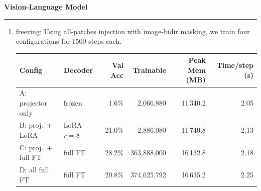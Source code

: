\documentclass[11pt]{article}
\newenvironment{question}[1]
    {
        \begin{center}
        \textbf{#1} \rmfamily
        \bigskip
        \hrule
    }
    {
        \end{center}
    }
\begin{document}
\begin{question}{Vision-Language Model}
\begin{enumerate}[label=(\alph*)]
    Contrary to the theoretical prediction, causal masking (M1) substantially outperforms image-bidir (M2) at 500 steps in the projector-only setting. With a randomly initialised projector, bidirectional visual self-attention in the decoder mixes 65 uninformative patch embeddings with each other, producing chaotic visual representations; the frozen decoder's attention heads — trained exclusively on causal text sequences — amplify this chaos rather than filtering it. The causal mask is closer to what the frozen decoder was pretrained on, so the question-token representations degrade less. M2 is also 2.77$\times$ slower per step due to SDPA with the custom 4D additive mask. Under a freeze configuration that adapts the decoder (B/C/D), M2's theoretical advantage would likely emerge.

    \item freezing: Using all-patches injection with image-bidir masking, we train four configurations for 1500 steps each.

    \begin{center}
    \begin{tabular}{llrrrr}
    \toprule
    Config & Decoder & Val Acc & Trainable & Peak Mem (MB) & Time/step (s) \\
    \midrule
    A: projector only   & frozen      &  1.6\% &      2,066,880 & 11\,340.2 & 2.05 \\
    B: proj.\ + LoRA    & LoRA $r=8$  & 21.0\% &      2,886,080 & 11\,740.8 & 2.13 \\
    C: proj.\ + full FT & full FT     & 28.2\% & 363,888,000    & 16\,132.8 & 2.18 \\
    D: all full FT      & full FT     & 20.8\% & 374,625,792    & 16\,635.2 & 2.25 \\
    \bottomrule
    \end{tabular}
    \end{center}


\end{enumerate}
\end{question}
\end{document}
